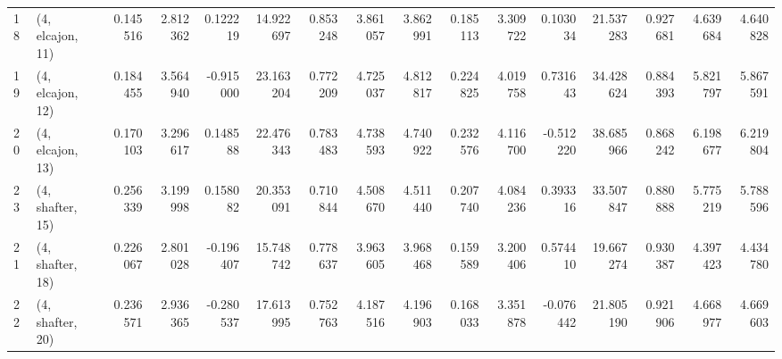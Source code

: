 \begin{tabular}{llrrrrrrrrrrrrrr}
18 &  (4, elcajon, 11) &   0.145516 &  2.812362 &  0.122219 &  14.922697 &  0.853248 &   3.861057 &  3.862991 &  0.185113 &  3.309722 &  0.103034 &   21.537283 &  0.927681 &   4.639684 &   4.640828 \\
19 &  (4, elcajon, 12) &   0.184455 &  3.564940 & -0.915000 &  23.163204 &  0.772209 &   4.725037 &  4.812817 &  0.224825 &  4.019758 &  0.731643 &   34.428624 &  0.884393 &   5.821797 &   5.867591 \\
20 &  (4, elcajon, 13) &   0.170103 &  3.296617 &  0.148588 &  22.476343 &  0.783483 &   4.738593 &  4.740922 &  0.232576 &  4.116700 & -0.512220 &   38.685966 &  0.868242 &   6.198677 &   6.219804 \\
23 &  (4, shafter, 15) &   0.256339 &  3.199998 &  0.158082 &  20.353091 &  0.710844 &   4.508670 &  4.511440 &  0.207740 &  4.084236 &  0.393316 &   33.507847 &  0.880888 &   5.775219 &   5.788596 \\
21 &  (4, shafter, 18) &   0.226067 &  2.801028 & -0.196407 &  15.748742 &  0.778637 &   3.963605 &  3.968468 &  0.159589 &  3.200406 &  0.574410 &   19.667274 &  0.930387 &   4.397423 &   4.434780 \\
22 &  (4, shafter, 20) &   0.236571 &  2.936365 & -0.280537 &  17.613995 &  0.752763 &   4.187516 &  4.196903 &  0.168033 &  3.351878 & -0.076442 &   21.805190 &  0.921906 &   4.668977 &   4.669603 \\
\bottomrule
\end{tabular}
